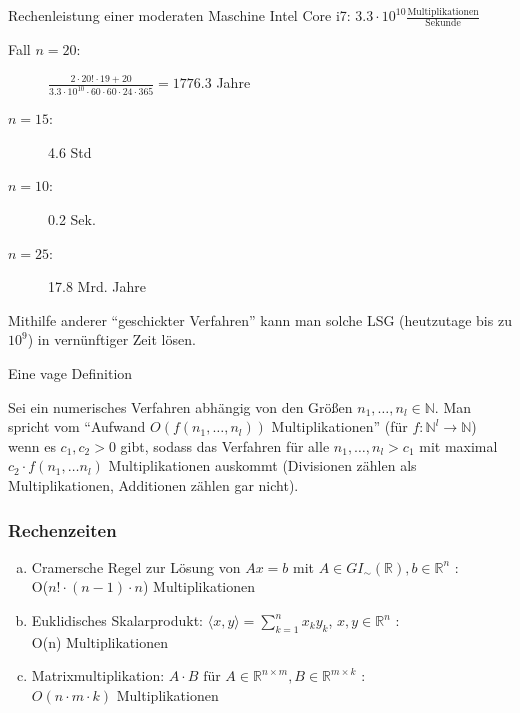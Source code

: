 Rechenleistung einer moderaten Maschine Intel Core i7: $3.3 \cdot 10^{10}
\frac{\text{Multiplikationen}}{\text{Sekunde}}$

\begin{description}
\item[\rm Fall $n = 20$:] $\frac{2 \cdot 20! \cdot 19 + 20}{3.3 \cdot 10^{10}
\cdot 60 \cdot 60 \cdot 24 \cdot 365} = 1776.3$ Jahre
\item[$n = 15$:] 4.6 Std
\item[$n = 10$:] 0.2 Sek.
\item[$n = 25$:] 17.8 Mrd. Jahre
\end{description}

Mithilfe anderer "`geschickter Verfahren"' kann man solche LSG
(heutzutage bis zu $10^9$) in vernünftiger Zeit lösen.

Eine vage Definition

\begin{Definition}
Sei ein numerisches Verfahren abhängig von den
Größen $n_1, \dots, n_l \in \mathbb{N}$. Man spricht vom
"`Aufwand $O(f(n_1, \dots, n_l))$ Multiplikationen"'
(für $f: \mathbb{N}^l \rightarrow \mathbb{N}$) wenn es
$c_1, c_2 > 0$ gibt, sodass das Verfahren für alle
$n_1, \dots, n_l > c_1$ mit maximal $c_2 \cdot f(n_1, \dots n_l)$
Multiplikationen auskommt (Divisionen zählen als Multiplikationen,
Additionen zählen gar nicht).
\end{Definition}

\subsubsection{Rechenzeiten}

\begin{enumerate}[(a)]
\item Cramersche Regel zur Lösung von
      $Ax = b$ mit $A \in GI_{\sim}(\mathbb{R}),
      b \in \mathbb{R}^n$ : \\
      O($n! \cdot (n-1)\cdot n$) Multiplikationen
\item Euklidisches Skalarprodukt:
      $\langle x,y\rangle = \sum_{k=1}^n x_k y_k$, $x,y \in \mathbb{R}^n$ :\\
      O(n) Multiplikationen
\item Matrixmultiplikation: $A \cdot B \text{ für } A\in
      \mathbb{R}^{n \times m}, B \in \mathbb{R}^{m \times k}$ : \\
      $O(n \cdot m \cdot k ) $ Multiplikationen
\end{enumerate}

